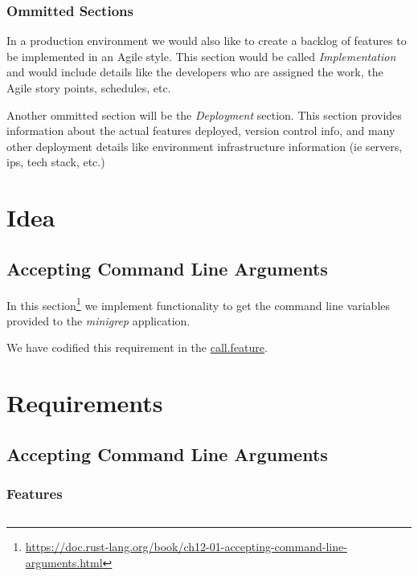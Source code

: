 \documentclass{book}
\begin{document}
\subsection{Ommitted Sections}
In a production environment we would also like to create a backlog of features
to be implemented in an Agile style.  This section would be called \emph{Implementation}
and would include details like the developers who are assigned the work, the 
Agile story points, schedules, etc.

Another ommitted section will be the \emph{Deployment} section.  This section
provides information about the actual features deployed, version control info,
and many other deployment details like environment infrastructure information
(ie servers, ips, tech stack, etc.) 

\chapter{Idea}

\section{Accepting Command Line Arguments}

In this section\footnote{\url{https://doc.rust-lang.org/book/ch12-01-accepting-command-line-arguments.html}}
we implement functionality to get the command line variables provided to the \emph{minigrep} application.

We have codified this requirement in the \hyperref[call_feature]{call.feature}.

\chapter{Requirements}

\section{Accepting Command Line Arguments}

\subsection{Features}

\inputminted{gherkin}{../features/call.feature}\label{call_feature}
\end{document}
